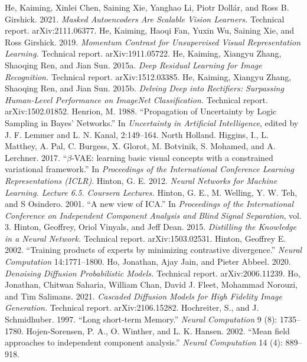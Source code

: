  He, Kaiming, Xinlei Chen, Saining Xie, Yanghao Li, Piotr Doll\'ar, and Ross B. Girshick. 2021. \emph{Masked Autoencoders Are Scalable Vision Learners.} Technical report. arXiv:2111.06377.
 He, Kaiming, Haoqi Fan, Yuxin Wu, Saining Xie, and Ross Girshick. 2019. \emph{Momentum Contrast for Unsupervised Visual Representation Learning.} Technical report. arXiv:1911.05722.
 He, Kaiming, Xiangyu Zhang, Shaoqing Ren, and Jian Sun. 2015a. \emph{Deep Residual Learning for Image Recognition.} Technical report. arXiv:1512.03385.
 He, Kaiming, Xiangyu Zhang, Shaoqing Ren, and Jian Sun. 2015b. \emph{Delving Deep into Rectifiers: Surpassing Human-Level Performance on ImageNet Classification.} Technical report. arXiv:1502.01852.
 Henrion, M. 1988. ``Propagation of Uncertainty by Logic Sampling in Bayes' Networks.'' In \emph{Uncertainty in Artificial Intelligence}, edited by J. F. Lemmer and L. N. Kanal, 2:149--164. North Holland.
 Higgins, I., L. Matthey, A. Pal, C. Burgess, X. Glorot, M. Botvinik, S. Mohamed, and A. Lerchner. 2017. ``$\beta$-VAE: learning basic visual concepts with a constrained variational framework.'' In \emph{Proceedings of the International Conference Learning Representations (ICLR)}.
 Hinton, G. E. 2012. \emph{Neural Networks for Machine Learning. Lecture 6.5. Coursera Lectures.}
 Hinton, G. E., M. Welling, Y. W. Teh, and S Osindero. 2001. ``A new view of ICA.'' In \emph{Proceedings of the International Conference on Independent Component Analysis and Blind Signal Separation}, vol. 3.
 Hinton, Geoffrey, Oriol Vinyals, and Jeff Dean. 2015. \emph{Distilling the Knowledge in a Neural Network.} Technical report. arXiv:1503.02531.
 Hinton, Geoffrey E. 2002. ``Training products of experts by minimizing contrastive divergence.'' \emph{Neural Computation} 14:1771--1800.
 Ho, Jonathan, Ajay Jain, and Pieter Abbeel. 2020. \emph{Denoising Diffusion Probabilistic Models.} Technical report. arXiv:2006.11239.
 Ho, Jonathan, Chitwan Saharia, William Chan, David J. Fleet, Mohammad Norouzi, and Tim Salimans. 2021. \emph{Cascaded Diffusion Models for High Fidelity Image Generation.} Technical report. arXiv:2106.15282.
 Hochreiter, S., and J. Schmidhuber. 1997. ``Long short-term Memory.'' \emph{Neural Computation} 9 (8): 1735--1780.
 Hojen-Sorensen, P. A., O. Winther, and L. K. Hansen. 2002. ``Mean field approaches to independent component analysis.'' \emph{Neural Computation} 14 (4): 889--918.
